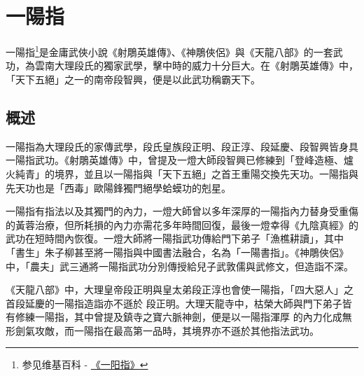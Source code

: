 \chapter{一陽指}
一陽指\footnote{参见维基百科 - \href{http://zh.wikipedia.org/wiki/\%E4\%B8\%80\%E9\%99\%BD\%E6\%8C\%87}{《一阳指》}}是金庸武俠小說《射鵰英雄傳》、《神鵰俠侶》與《天龍八部》的一套武功，為雲南大理段氏的獨家武學，擊中時的威力十分巨大。在《射鵰英雄傳》中，「天下五絕」之一的南帝段智興，便是以此武功稱霸天下\cite{yiyangzhi}。

\section{概述}

一陽指為大理段氏的家傳武學，段氏皇族段正明、段正淳、段延慶、段智興皆身具一陽指武功。《射鵰英雄傳》中，曾提及一燈大師段智興已修練到「登峰造極、爐火純青」的境界，並且以一陽指與「天下五絕」之首王重陽交換先天功。一陽指與先天功也是「西毒」歐陽鋒獨門絕學蛤蟆功的剋星。

一陽指有指法以及其獨門的內力，一燈大師曾以多年深厚的一陽指內力替身受重傷的黃蓉治療，但所耗損的內力亦需花多年時間回復，最後一燈幸得《九陰真經》的武功在短時間內恢復。一燈大師將一陽指武功傳給門下弟子「漁樵耕讀」，其中「書生」朱子柳甚至將一陽指與中國書法融合，名為「一陽書指」。《神鵰俠侶》中，「農夫」武三通將一陽指武功分別傳授給兒子武敦儒與武修文，但造詣不深。

《天龍八部》中，大理皇帝段正明與皇太弟段正淳也會使一陽指，「四大惡人」之首段延慶的一陽指造詣亦不遜於
段正明。大理天龍寺中，枯榮大師與門下弟子皆有修練一陽指，其中曾提及鎮寺之寶六脈神劍，便是以一陽指渾厚
的內力化成無形劍氣攻敵，而一陽指在最高第一品時，其境界亦不遜於其他指法武功。


